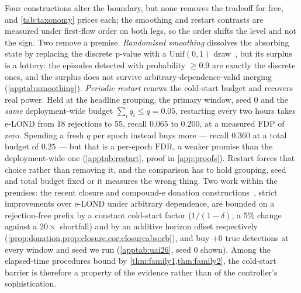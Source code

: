 \documentclass[conference]{IEEEtran}
\newcommand{\FDP}{\mathrm{FDP}}
\newcommand{\FDR}{\mathrm{FDR}}
\begin{document}
Four constructions alter the boundary, but none removes the tradeoff for free, and \cref{tab:taxonomy}
prices each; the smoothing and restart contrasts are measured under first-flow order on both legs, so
the order shifts the level and not the sign. Two remove a premise. \emph{Randomised smoothing} dissolves
the absorbing state by replacing the discrete p-value with a $\mathrm{Unif}(0,1)$
draw~\cite{vovk2005alrw,hennhofer2026resolution}, but its surplus is a lottery: the episodes detected
with probability $\ge0.9$ are exactly the discrete ones, and the surplus does not survive
arbitrary-dependence-valid merging (\cref{apptab:smoothing}). \emph{Periodic restart} renews the
cold-start budget and recovers real power. Held at the headline grouping, the primary window, seed 0
and the \emph{same} deployment-wide budget $\sum_i q_i\le q=0.05$, restarting every two hours takes
e-LOND from 18 rejections to 55, recall $0.065$ to $0.200$, at a measured $\FDP$ of zero. Spending a
fresh $q$ per epoch instead buys more --- recall $0.360$ at a total budget of $0.25$ --- but that is a
per-epoch $\FDR$, a weaker promise than the deployment-wide one
(\cref{apptab:restart}, proof in \cref{app:proofs}). Restart forces that choice rather than removing
it, and the comparison has to hold grouping, seed and total budget fixed or it measures the wrong
thing. Two work within the premises: the recent closure and compound-e
donation constructions~\cite{xu2026eclosure,xu2025closure}, strict improvements over e-LOND under
arbitrary dependence, are bounded on a rejection-free prefix by a constant cold-start factor
($1/(1-\delta)$, a $5\%$ change against a $20\times$ shortfall) and by an additive horizon offset
respectively (\cref{prop:donation,prop:closure,cor:closureabsorb}), and buy $+0$ true detections at
every window and seed we run (\cref{apptab:uai26}, seed 0 shown). Among the elapsed-time procedures
bound by \cref{thm:family1,thm:family2}, the cold-start barrier is therefore a property of the evidence
rather than of the controller's sophistication.
\end{document}
